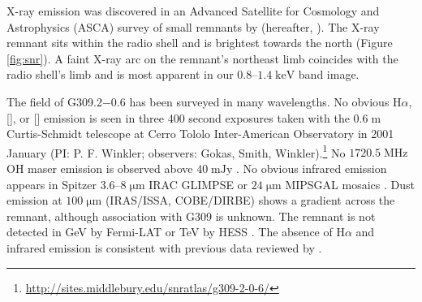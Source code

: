 \documentclass[twocolumn,tighten,trackchanges]{aastex61}
\newcommand*{\mt}{\mathrm}
\newcommand*{\unit}[1]{\;\mt{#1}}  %
\newcommand*{\Gsnr}{G309.2$-$0.6}
\begin{document}

X-ray emission was discovered in an Advanced Satellite for Cosmology and
Astrophysics (ASCA) survey of small remnants by \citet{rakowski2001}
(hereafter, ).
The X-ray remnant sits within the radio shell and is brightest towards the
north (Figure \ref{fig:snr}).
A faint X-ray arc on the remnant's northeast limb coincides with the radio
shell's limb and is most apparent in our $0.8$--$1.4 \unit{keV}$ band image.

The field of \Gsnr{} has been surveyed in many wavelengths.
No obvious H$\alpha$, [], or [] emission is seen in three
400 second exposures taken with the $0.6 \unit{m}$ Curtis-Schmidt telescope at
Cerro Tololo Inter-American Observatory in 2001 January
(PI: P. F. Winkler; observers: Gokas, Smith, Winkler).\footnote{\url{http://sites.middlebury.edu/snratlas/g309-2-0-6/}}
No $1720.5 \unit{MHz}$ OH maser emission is observed above $40 \unit{mJy}$
\citep{green1997}.
No obvious infrared emission appears in Spitzer
$3.6$--$8 \unit{{\mu}m}$ IRAC GLIMPSE or $24 \unit{{\mu}m}$ MIPSGAL mosaics
\citep{churchwell2009, carey2009}.
Dust emission at $100 \unit{{\mu}m}$ (IRAS/ISSA, COBE/DIRBE) shows a
gradient across the remnant, although association with G309 is unknown.  %
The remnant is not detected in GeV by Fermi-LAT \citep{acero2016} or TeV by
HESS \citep{bochow2011}.
The absence of H$\alpha$ and infrared emission is consistent with previous
data reviewed by .
\end{document}
